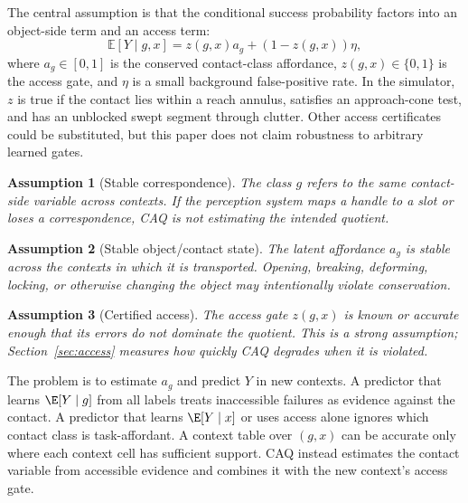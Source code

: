 \documentclass{article}
\newtheorem{assumption}{Assumption}
\newcommand{\ctx}{x}
\newcommand{\gate}{z}
\newcommand{\aff}{a}
\newcommand{\class}{g}
\newcommand{\Expect}{\mathbb{E}}
\begin{document}
The central assumption is that the conditional success probability factors into an object-side term and an access term:
\begin{equation}
    \Expect[Y \mid \class,\ctx]
    =
    \gate(\class,\ctx)\aff_{\class}
    +
    (1-\gate(\class,\ctx))\eta,
    \label{eq:factor}
\end{equation}
where $\aff_{\class}\in[0,1]$ is the conserved contact-class affordance, $\gate(\class,\ctx)\in\{0,1\}$ is the access gate, and $\eta$ is a small background false-positive rate. In the simulator, $\gate$ is true if the contact lies within a reach annulus, satisfies an approach-cone test, and has an unblocked swept segment through clutter. Other access certificates could be substituted, but this paper does not claim robustness to arbitrary learned gates.

\begin{assumption}[Stable correspondence]
The class $\class$ refers to the same contact-side variable across contexts. If the perception system maps a handle to a slot or loses a correspondence, CAQ is not estimating the intended quotient.
\end{assumption}

\begin{assumption}[Stable object/contact state]
The latent affordance $\aff_{\class}$ is stable across the contexts in which it is transported. Opening, breaking, deforming, locking, or otherwise changing the object may intentionally violate conservation.
\end{assumption}

\begin{assumption}[Certified access]
The access gate $\gate(\class,\ctx)$ is known or accurate enough that its errors do not dominate the quotient. This is a strong assumption; Section~\ref{sec:access} measures how quickly CAQ degrades when it is violated.
\end{assumption}

The problem is to estimate $\aff_{\class}$ and predict $Y$ in new contexts. A predictor that learns $\E[Y\mid \class]$ from all labels treats inaccessible failures as evidence against the contact. A predictor that learns $\E[Y\mid \ctx]$ or uses access alone ignores which contact class is task-affordant. A context table over $(\class,\ctx)$ can be accurate only where each context cell has sufficient support. CAQ instead estimates the contact variable from accessible evidence and combines it with the new context's access gate.
\end{document}
